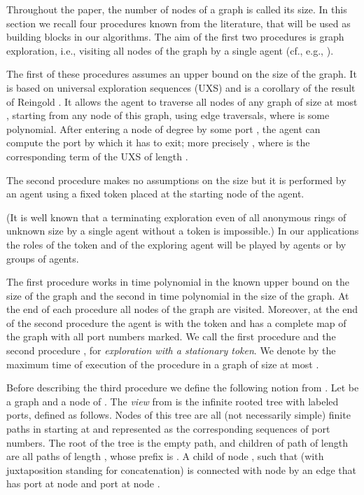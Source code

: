 \documentclass[11pt]{article}
\begin{document}
Throughout the paper, 
the number of nodes of a graph is called its size.
In this section we recall four procedures known from the literature, that will be used as building blocks in our algorithms. 
The aim of the first two procedures is graph exploration, i.e., visiting all nodes of the graph by a single agent (cf., e.g., \cite{CDK,Re}). 

{The first of these procedures assumes an upper bound  on the size of the graph. It is based on universal exploration sequences (UXS) and is a corollary of the result of Reingold \cite{Re}. It allows the agent to traverse all nodes of any graph of size at most , starting from any node of this graph, using  edge traversals, where  is some polynomial. After entering a node of degree  by some port ,
the agent can compute the port  by which it has to exit; more precisely , where  is the corresponding term of the UXS of length . 

The second procedure makes no assumptions on the size but 
it is performed by an agent using a fixed token placed at the starting node of the agent.}
(It is well known that a terminating exploration even of all anonymous rings of unknown size by a single agent without a token is impossible.)
In our applications the roles of the token and of the exploring agent will be played by agents or by groups of agents.

The first procedure works in time polynomial in the known upper bound  on the size of the graph and the second in time polynomial in the size of the graph. At the end of each procedure all nodes of the graph are visited.
Moreover, at the end of the second procedure the agent is with the token and has a complete map of the graph with all port numbers marked.
We call the first procedure  and the second procedure , for {\em exploration with a stationary token}.
{We denote by  the maximum time of execution of the procedure  
in a graph of size at most .} 







Before describing the third procedure we define the
following notion from \cite{YK3}. Let  be a graph and  a node of .  
The {\em view} from  is the infinite rooted tree  with labeled ports, defined as follows.
Nodes of this tree are all (not necessarily simple) finite paths in  starting at  and represented as the corresponding sequences of port numbers.
The root of the tree is the empty path, and children of path  of length  are all paths of length , whose prefix is .
A child  of node , such that  (with juxtaposition standing for concatenation) is connected with node  by an edge
that has port  at node  and port  at node .
\end{document}

